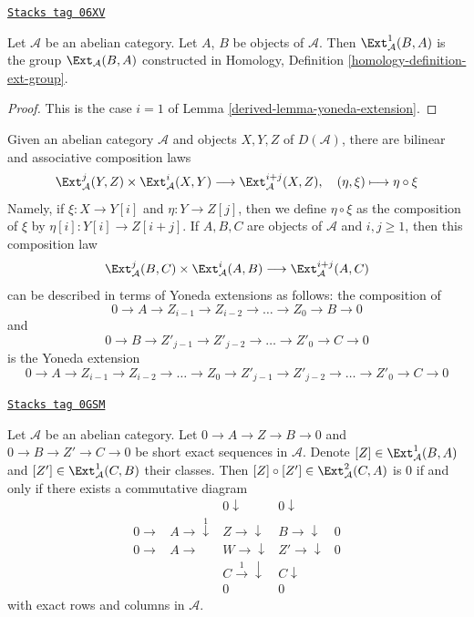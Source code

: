 \begin{lemma}[Ext 1]
\label{derived-lemma-ext-1}
\href{https://stacks.math.columbia.edu/tag/06XV}{\texttt{Stacks tag 06XV}}

Let $\mathcal{A}$ be an abelian category. Let $A$, $B$ be objects
of $\mathcal{A}$. Then $\Ext^1_\mathcal{A}(B, A)$ is
the group $\Ext_\mathcal{A}(B, A)$ constructed in
Homology, Definition \ref{homology-definition-ext-group}.
\end{lemma}

\begin{proof}

This is the case $i = 1$ of
Lemma \ref{derived-lemma-yoneda-extension}.
\end{proof}

Given an abelian category $\mathcal{A}$ and objects $X, Y, Z$ of
$D(\mathcal{A})$, there are bilinear and associative composition laws
$$
\Ext^j_\mathcal{A}(Y, Z) \times \Ext^i_\mathcal{A}(X, Y)
\longrightarrow
\Ext^{i + j}_\mathcal{A}(X, Z),\quad
(\eta, \xi) \longmapsto \eta \circ \xi
$$
Namely, if $\xi : X \to Y[i]$ and $\eta : Y \to Z[j]$, then
we define $\eta \circ \xi$ as the composition of $\xi$ by
$\eta[i] : Y[i] \to Z[i + j]$. If $A, B, C$ are objects of
$\mathcal{A}$ and $i, j \geq 1$, then this composition law
$$
\Ext^j_\mathcal{A}(B, C) \times \Ext^i_\mathcal{A}(A, B)
\longrightarrow
\Ext^{i + j}_\mathcal{A}(A, C)
$$
can be described in terms of Yoneda extensions as follows: the
composition of
$$
0 \to A \to Z_{i - 1} \to Z_{i - 2} \to \ldots \to Z_0 \to B \to 0
$$
and
$$
0 \to B \to Z'_{j - 1} \to Z'_{j - 2} \to \ldots \to Z'_0 \to C \to 0
$$
is the Yoneda extension
$$
0 \to A \to Z_{i - 1} \to Z_{i - 2} \to \ldots \to Z_0 \to
Z'_{j - 1} \to Z'_{j - 2} \to \ldots \to Z'_0 \to C \to 0
$$

\begin{lemma}
\label{derived-lemma-cup-ext-1-zero}
\href{https://stacks.math.columbia.edu/tag/0GSM}{\texttt{Stacks tag 0GSM}}

Let $\mathcal{A}$ be an abelian category. Let
$0 \to A \to Z \to B \to 0$ and
$0 \to B \to Z' \to C \to 0$ be short exact sequences in $\mathcal{A}$.
Denote $[Z] \in \Ext^1_\mathcal{A}(B, A)$ and
$[Z'] \in \Ext^1_\mathcal{A}(C, B)$ their classes.
Then $[Z] \circ [Z'] \in \Ext^2_\mathcal{A}(C, A)$ is $0$ if and
only if there exists a commutative diagram
$$
\begin{array}{ccccc} &  & 0 \downarrow & 0 \downarrow &  \\ 0 \longrightarrow & A \longrightarrow\overset{1}{\downarrow} & Z \longrightarrow\downarrow & B \longrightarrow\downarrow & 0 \\ 0 \longrightarrow & A \longrightarrow & W \longrightarrow\downarrow & Z' \longrightarrow\downarrow & 0 \\  &  & C \overset{1}{\longrightarrow}\downarrow & C \downarrow &  \\  &  & 0 & 0 & \end{array}
$$
with exact rows and columns in $\mathcal{A}$.
\end{lemma}

